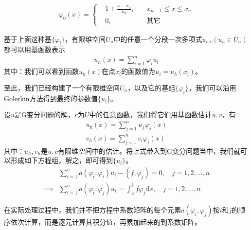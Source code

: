             \begin{align*}
                \varphi_0(x) =
                \left \{
                    \begin{aligned}
                        &1 + \frac{x - x_n}{h_n} , \quad &x_{n - 1} \leqslant x \leqslant x_n \\
                        &0,  \quad &\text{其它}
                    \end{aligned}
                 \right.
            \end{align*}
            \par
            基于上面这种基$\{\varphi _i\}$，有限维空间$U_n$中的任意一个分段一次多项式$u_h,(u_h \in U_n)$都可以用基函数表示
            \begin{align*}
                u_h(x) = \sum _{i = 1}^n \varphi_i u_i
            \end{align*}
            其中：我们可以看到函数$u_h(x)$在点$x_i$的函数值为$u_i = u_h(x_i)$。
            \par
            至此，我们已经构建了一个有限维空间$U_n$，以及它的基组$\{\varphi _i\}$，我们可以沿用Golerkin方法得到最终的参数值$\{u _i\}$。
            \par
            设$u$是G变分问题的解，$v$为$U$中的任意函数，我们将它们用基函数估计$u,v$，有
            \begin{align*}
                u_h(x) = \sum_{j = 1}^n u_j \varphi_j(x)\\
                v_h(x) = \sum_{j = 1}^n v_i \varphi_i(x)
            \end{align*}
            其中：$u_h,v_h$是$u,v$有限维空间中的估计。将上式带入到G变分问题当中，我们就可以形成如下方程组，解之，即可得到$\{u _i\}$。
            \begin{align*}
                            &\sum_{i = 1}^n a(\varphi_i,\varphi_i)u_i - (f,\varphi_j) = 0 ,\quad j = 1,2,\dots,n\\
                \implies {} &\sum_{i = 1}^n a(\varphi_i,\varphi_j)u_i = \int_a^bf \varphi_j \mathrm{d}x ,\quad j = 1,2,\dots,n
            \end{align*}
            \par
            在实际处理过程中，我们并不把方程中系数矩阵的每个元素$a(\varphi_i, \varphi_j)$按$i$和$j$的顺序依次计算，而是逐元计算其积分值，再累加起来的到系数矩阵。


